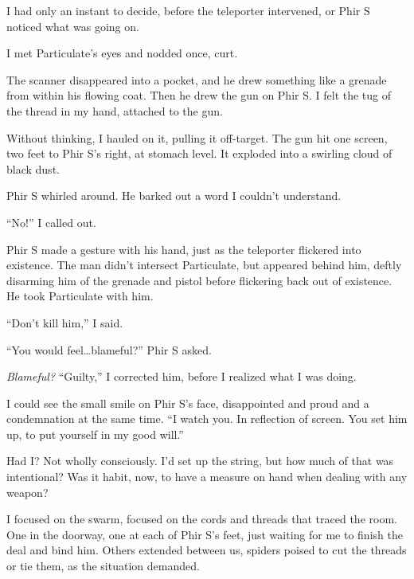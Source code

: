 I had only an instant to decide, before the teleporter intervened, or Phir S noticed what was going on.



I met Particulate's eyes and nodded once, curt.



The scanner disappeared into a pocket, and he drew something like a grenade from within his flowing coat.  Then he drew the gun on Phir S.  I felt the tug of the thread in my hand, attached to the gun.



Without thinking, I hauled on it, pulling it off-target.  The gun hit one screen, two feet to Phir S's right, at stomach level.  It exploded into a swirling cloud of black dust.



Phir S whirled around.  He barked out a word I couldn't understand.



``No!'' I called out.



Phir S made a gesture with his hand, just as the teleporter flickered into existence.  The man didn't intersect Particulate, but appeared behind him, deftly disarming him of the grenade and pistol before flickering back out of existence.  He took Particulate with him.



``Don't kill him,'' I said.



``You would feel\ldots blameful?'' Phir S asked.



\emph{Blameful?  }``Guilty,'' I corrected him, before I realized what I was doing.



I could see the small smile on Phir S's face, disappointed and proud and a condemnation at the same time.  ``I watch you.  In reflection of screen.  You set him up, to put yourself in my good will.''



Had I?  Not wholly consciously.  I'd set up the string, but how much of that was intentional?  Was it habit, now, to have a measure on hand when dealing with any weapon?



I focused on the swarm, focused on the cords and threads that traced the room.  One in the doorway, one at each of Phir S's feet, just waiting for me to finish the deal and bind him.  Others extended between us, spiders poised to cut the threads or tie them, as the situation demanded.



